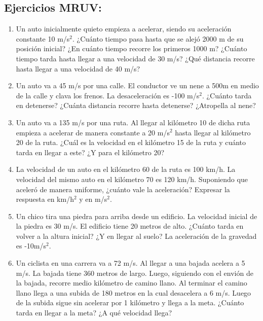 \subsection*{Ejercicios MRUV:}

\begin{enumerate}
    \item Un auto inicialmente quieto empieza a acelerar, siendo su aceleración constante 10 m/s$^2$. ¿Cuánto tiempo pasa hasta que se alejó 2000 m de su posición inicial? ¿En cuánto tiempo recorre los primeros 1000 m? ¿Cuánto tiempo tarda hasta llegar a una velocidad de 30 m/s? ¿Qué distancia recorre hasta llegar a una velocidad de 40 m/s?
    
    \item Un auto va a 45 m/s por una calle. El conductor ve un nene a 500m en medio de la calle y clava los frenos. La desaceleración es -100 m/s$^2$. ¿Cuánto tarda en detenerse? ¿Cuánta distancia recorre hasta detenerse? ¿Atropella al nene? 
    
    \item Un auto va a 135 m/s por una ruta. Al llegar al kilómetro 10 de dicha ruta empieza a acelerar de manera constante a 20 m/s$^2$ hasta llegar al kilómetro 20 de la ruta. ¿Cuál es la velocidad en el kilómetro 15 de la ruta y cuánto tarda en llegar a este? ¿Y para el kilómetro 20? 
    
    \item La velocidad de un auto en el kilómetro 60 de la ruta es 100 km/h. La velocidad del mismo auto en el kilómetro 70 es 120 km/h. Suponiendo que aceleró de manera uniforme, ¿cuánto vale la aceleración? Expresar la respuesta en km/h$^2$ y en m/s$^2$. %
    
    \item Un chico tira una piedra para arriba desde un edificio. La velocidad inicial de la piedra es 30 m/s. El edificio tiene 20 metros de alto. ¿Cuánto tarda en volver a la altura inicial? ¿Y en llegar al suelo? La aceleración de la gravedad es -10m/s$^2$. %
    
    \item Un ciclista en una carrera va a 72 m/s. Al llegar a una bajada acelera a 5 m/s. La bajada tiene 360 metros de largo. Luego, siguiendo con el envión de la bajada, recorre medio kilómetro de camino llano. Al terminar el camino llano llega a una subida de 180 metros en la cual desacelera a 6 m/s. Luego de la subida sigue sin acelerar por 1 kilómetro y llega a la meta. ¿Cuánto tarda en llegar a la meta? ¿A qué velocidad llega?


\end{enumerate}
